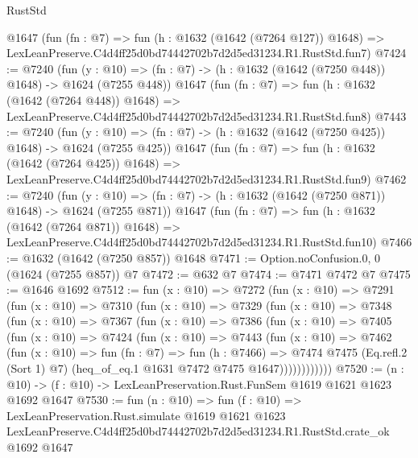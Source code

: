 \begin{lexlean}{RustStd}
\begin{coremodule}
    @1647
    (fun (fn : @7) =>
    fun (h : @1632 (@1642 (@7264 @127)) @1648) =>
    LexLeanPreserve.C4d4ff25d0bd74442702b7d2d5ed31234.R1.RustStd.fun7)
@7424 := @7240
    (fun (y : @10) => (fn : @7) -> (h : @1632 (@1642 (@7250 @448)) @1648) -> @1624 (@7255 @448))
    @1647
    (fun (fn : @7) =>
    fun (h : @1632 (@1642 (@7264 @448)) @1648) =>
    LexLeanPreserve.C4d4ff25d0bd74442702b7d2d5ed31234.R1.RustStd.fun8)
@7443 := @7240
    (fun (y : @10) => (fn : @7) -> (h : @1632 (@1642 (@7250 @425)) @1648) -> @1624 (@7255 @425))
    @1647
    (fun (fn : @7) =>
    fun (h : @1632 (@1642 (@7264 @425)) @1648) =>
    LexLeanPreserve.C4d4ff25d0bd74442702b7d2d5ed31234.R1.RustStd.fun9)
@7462 := @7240
    (fun (y : @10) => (fn : @7) -> (h : @1632 (@1642 (@7250 @871)) @1648) -> @1624 (@7255 @871))
    @1647
    (fun (fn : @7) =>
    fun (h : @1632 (@1642 (@7264 @871)) @1648) =>
    LexLeanPreserve.C4d4ff25d0bd74442702b7d2d5ed31234.R1.RustStd.fun10)
@7466 := @1632 (@1642 (@7250 @857)) @1648
@7471 := Option.noConfusion.{0, 0} (@1624 (@7255 @857)) @7
@7472 := @632 @7
@7474 := @7471 @7472 @7
@7475 := @1646 @1692
@7512 := fun (x : @10) =>
  @7272
    (fun (x : @10) =>
    @7291
      (fun (x : @10) =>
      @7310
        (fun (x : @10) =>
        @7329
          (fun (x : @10) =>
          @7348
            (fun (x : @10) =>
            @7367
              (fun (x : @10) =>
              @7386
                (fun (x : @10) =>
                @7405
                  (fun (x : @10) =>
                  @7424
                    (fun (x : @10) =>
                    @7443
                      (fun (x : @10) =>
                      @7462
                        (fun (x : @10) =>
                        fun (fn : @7) =>
                        fun (h : @7466) =>
                        @7474
                          @7475
                          (Eq.refl.{2} (Sort 1) @7)
                          (heq_of_eq.{1} @1631 @7472 @7475 @1647))))))))))))
@7520 := (n : @10) -> (f : @10) -> LexLeanPreservation.Rust.FunSem @1619 @1621 @1623 @1692 @1647
@7530 := fun (n : @10) =>
  fun (f : @10) =>
  LexLeanPreservation.Rust.simulate
    @1619
    @1621
    @1623
    LexLeanPreserve.C4d4ff25d0bd74442702b7d2d5ed31234.R1.RustStd.crate_ok
    @1692
    @1647
\end{coremodule}
\end{lexlean}
